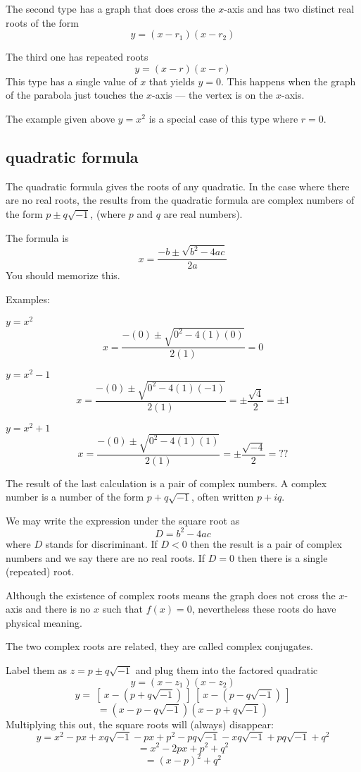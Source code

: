 \documentclass[11pt, oneside]{article}
\begin{document}
The second type has a graph that does cross the $x$-axis and has two distinct real roots of the form
\[ y = (x - r_1)(x - r_2) \]

The third one has repeated roots
\[ y = (x - r)(x - r) \]
This type has a single value of $x$ that yields $y = 0$.  This happens when the graph of the parabola just touches the $x$-axis --- the vertex is on the $x$-axis.

The example given above $y = x^2$ is a special case of this type where $r = 0$.

\subsection*{quadratic formula}
The quadratic formula gives the roots of any quadratic.  In the case where there are no real roots, the results from the quadratic formula are complex numbers of the form $p \pm q \sqrt{-1}$, (where $p$ and $q$ are real numbers).

The formula is
\[ x = \frac{-b \pm \sqrt{b^2 - 4ac}}{2a} \]
You should memorize this.

Examples:

$y = x^2$
\[ x = \frac{-(0) \pm \sqrt{0^2 - 4(1)(0)}}{2(1)} = 0 \]

$y = x^2 - 1$
\[ x = \frac{-(0) \pm \sqrt{0^2 - 4(1)(-1)}}{2(1)} = \pm \frac{\sqrt{4}}{2} = \pm 1 \]

$y = x^2 + 1$
\[ x = \frac{-(0) \pm \sqrt{0^2 - 4(1)(1)}}{2(1)} =  \pm \frac{\sqrt{-4}}{2} = ?? \]

The result of the last calculation is a pair of complex numbers.  A complex number is a number of the form $p + q \sqrt{-1}$, often written $p + iq$.

We may write the expression under the square root as
\[ D = b^2 - 4ac \]
where $D$ stands for discriminant.  If $D < 0$ then the result is a pair of complex numbers and we say there are no real roots.  If $D = 0$ then there is a single (repeated) root.

Although the existence of complex roots means the graph does not cross the $x$-axis and there is no $x$ such that $f(x) = 0$, nevertheless these roots do have physical meaning.  

The two complex roots are related, they are called complex conjugates.  

Label them as $z = p \pm q \sqrt{-1}$ and plug them into the factored quadratic
\[ y = (x - z_1)(x - z_2) \]
\[ y = \ [ \ x - (p + q \sqrt{-1} ) \ ] \ [ \ x - (p - q \sqrt{-1} ) \ ] \]
\[ = (x - p - q \sqrt{-1})(x - p + q \sqrt{-1}) \]
Multiplying this out, the square roots will (always) disappear:
\[ y = x^2 - px + xq \sqrt{-1} - px + p^2 - pq \sqrt{-1} - xq \sqrt{-1} + pq \sqrt{-1} + q^2 \]
\[ = x^2 - 2px + p^2 + q^2 \]
\[ = (x - p)^2 + q^2 \]
\end{document}
